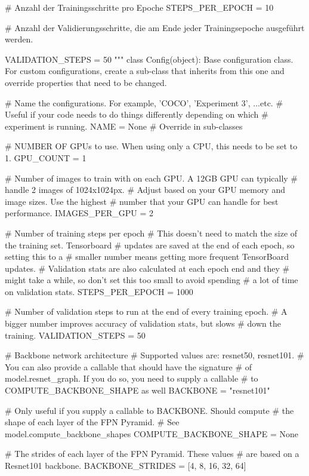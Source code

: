     # Anzahl der Trainingsschritte pro Epoche
    STEPS_PER_EPOCH = 10
    
    # Anzahl der Validierungsschritte, die am Ende jeder Trainingsepoche ausgeführt werden.
    
    VALIDATION_STEPS = 50
"""
class Config(object):
    Base configuration class. For custom configurations, create a
    sub-class that inherits from this one and override properties
    that need to be changed.
    
    # Name the configurations. For example, 'COCO', 'Experiment 3', ...etc.
    # Useful if your code needs to do things differently depending on which
    # experiment is running.
    NAME = None  # Override in sub-classes

    # NUMBER OF GPUs to use. When using only a CPU, this needs to be set to 1.
    GPU_COUNT = 1

    # Number of images to train with on each GPU. A 12GB GPU can typically
    # handle 2 images of 1024x1024px.
    # Adjust based on your GPU memory and image sizes. Use the highest
    # number that your GPU can handle for best performance.
    IMAGES_PER_GPU = 2

    # Number of training steps per epoch
    # This doesn't need to match the size of the training set. Tensorboard
    # updates are saved at the end of each epoch, so setting this to a
    # smaller number means getting more frequent TensorBoard updates.
    # Validation stats are also calculated at each epoch end and they
    # might take a while, so don't set this too small to avoid spending
    # a lot of time on validation stats.
    STEPS_PER_EPOCH = 1000

    # Number of validation steps to run at the end of every training epoch.
    # A bigger number improves accuracy of validation stats, but slows
    # down the training.
    VALIDATION_STEPS = 50

    # Backbone network architecture
    # Supported values are: resnet50, resnet101.
    # You can also provide a callable that should have the signature
    # of model.resnet_graph. If you do so, you need to supply a callable
    # to COMPUTE_BACKBONE_SHAPE as well
    BACKBONE = "resnet101"

    # Only useful if you supply a callable to BACKBONE. Should compute
    # the shape of each layer of the FPN Pyramid.
    # See model.compute_backbone_shapes
    COMPUTE_BACKBONE_SHAPE = None

    # The strides of each layer of the FPN Pyramid. These values
    # are based on a Resnet101 backbone.
    BACKBONE_STRIDES = [4, 8, 16, 32, 64]

